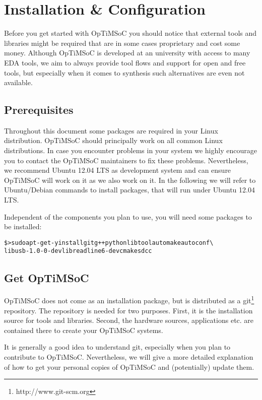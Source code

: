 \chapter{Installation \& Configuration}
\label{chap:installation}

Before you get started with OpTiMSoC you should notice that external
tools and libraries might be required that are in some cases
proprietary and cost some money. Although OpTiMSoC is developed at an
university with access to many EDA tools, we aim to always provide
tool flows and support for open and free tools, but especially when it
comes to synthesis such alternatives are even not available.

\section{Prerequisites}

Throughout this document some packages are required in your Linux
distribution. OpTiMSoC should principally work on all common Linux
distributions. In case you encounter problems in your system we highly
encourage you to contact the OpTiMSoC maintainers to fix these
problems. Nevertheless, we recommend Ubuntu 12.04 LTS as development
system and can ensure OpTiMSoC will work on it as we also work on it.
In the following we will refer to Ubuntu/Debian commands to install
packages, that will run under Ubuntu 12.04 LTS.

Independent of the components you plan to use, you will need some
packages to be installed:

\begin{alltt}
\$> sudo apt-get -y install git g++ python libtool automake autoconf \textbackslash
   libusb-1.0-0-dev libreadline6-dev cmake sdcc
\end{alltt}

\section{Get OpTiMSoC}

OpTiMSoC does not come as an installation package, but is distributed
as a git\footnote{http://www.git-scm.org} repository. The repository
is needed for two purposes. First, it is the installation source for
tools and libraries. Second, the hardware sources, applications
etc. are contained there to create your OpTiMSoC systems.

It is generally a good idea to understand git, especially when you
plan to contribute to OpTiMSoC. Nevertheless, we will give a more
detailed explanation of how to get your personal copies of OpTiMSoC
and (potentially) update them.

